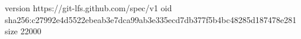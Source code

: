 version https://git-lfs.github.com/spec/v1
oid sha256:c27992e4d5522ebeab3e7dca99ab3e335ecd7db377f5b4bc48285d187478e281
size 22000
